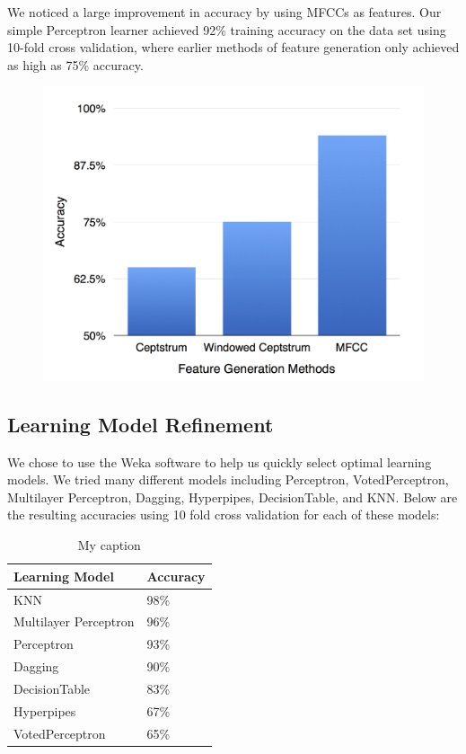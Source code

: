 \documentclass{article}
\begin{document}
We noticed a large improvement in accuracy by using MFCCs as features. Our simple Perceptron learner achieved 92\% training accuracy on the data set using 10-fold cross validation, where earlier methods of feature generation only achieved as high as 75\% accuracy.

\begin{figure}[H]
\includegraphics[width=\linewidth]{feature_generation_methods}
\end{figure}


\subsection{Learning Model Refinement}

We chose to use the Weka software to help us quickly select optimal learning models. We tried many different models including Perceptron, VotedPerceptron, Multilayer Perceptron, Dagging, Hyperpipes, DecisionTable, and KNN. Below are the resulting accuracies using 10 fold cross validation for each of these models:

\begin{table}[H]
\centering
\caption{My caption}
\label{my-label}
\begin{tabular}{|l|l|}
\hline
Learning Model        & Accuracy \\ \hline
KNN                   & 98\%     \\ \hline
Multilayer Perceptron & 96\%     \\ \hline
Perceptron            & 93\%     \\ \hline
Dagging               & 90\%     \\ \hline
DecisionTable         & 83\%     \\ \hline
Hyperpipes            & 67\%     \\ \hline
VotedPerceptron       & 65\%     \\ \hline
\end{tabular}
\end{table}
\end{document}
